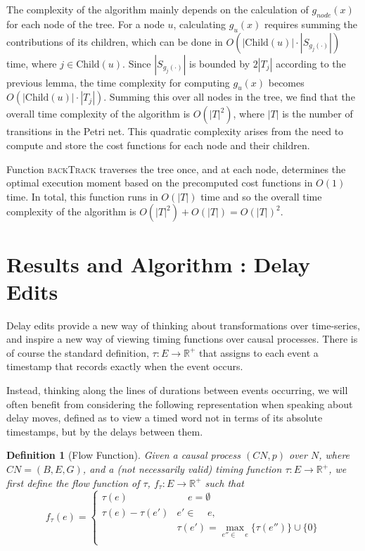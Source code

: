 \documentclass[conference]{IEEEtran}
\newcounter{cases}
\DeclareMathOperator*{\pre}{^\bullet}
\newtheorem{definition}{Definition}
\begin{document}
The complexity of the algorithm mainly depends on the 
calculation of $g_{node}(x)$ for each node of the tree. For 
a node $u$, calculating $g_{u}(x)$ requires summing the 
contributions of its children, which can be done in 
$O(|\text{Child}(u)| \cdot |S_{g_{j}(\cdot)}|)$ time, where 
$j \in \text{Child}(u)$. Since $|S_{g_{j}(\cdot)}|$ is bounded 
by $2|T_j|$ according to the previous lemma, the time 
complexity for computing $g_{u}(x)$ becomes 
$O(|\text{Child}(u)| \cdot |T_j|)$. Summing this over 
all nodes in the tree, we find that the overall time 
complexity of the algorithm is $O(|T|^2)$, where $|T|$ 
is the number of transitions in the Petri net. This quadratic 
complexity arises from the need to compute and store the cost 
functions for each node and their children.

Function \textsc{backTrack} traverses the tree once, and at each node,
determines the optimal execution moment based on the precomputed cost functions 
in $O(1)$ time. In total, this function runs in $O(|T|)$ time and 
so the overall time complexity of the algorithm is
$O(|T|^2) + O(|T|) = O(|T|)^2$. 


\section{Results and Algorithm : Delay Edits}\label{4}
Delay edits provide a new way of thinking about transformations over time-series, and inspire a new way of viewing timing functions over causal processes. 
There is of course the standard definition, $\tau : E \to \mathbb{R}^+$ that assigns to each event a timestamp that records exactly when the event occurs. 

Instead, thinking along the lines of durations between events occurring, we will often benefit from considering the following representation when speaking about delay moves, defined as to view a timed word not in terms of its absolute timestamps, but by the delays between them. 

\begin{definition}[Flow Function]
	Given a causal process $(CN, p)$ over $N$, where $CN = (B, E, G)$, and a (not necessarily valid) timing function $\tau : E \to \mathbb{R}^+$, we first define the \textit{flow} function of $\tau$, $f_{\tau} : E \to \mathbb{R}^+$ such that 
	$$f_{\tau}(e) = \begin{cases} 
		\tau(e) & \pre \pre e = \emptyset\\
		\tau(e) - \tau(e') &e' \in   \pre \pre e,\\ & \tau(e') = \max\limits_{e'' \in \pre \pre e} {\{\tau(e'')\} \cup \{0\}}\\
	\end{cases}
	$$
	
\end{definition}
\end{document}
